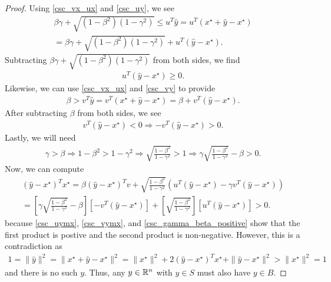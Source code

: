 \begin{proof}
Using \cref{csc_vx_ux} and \cref{csc_uy}, we see
\begin{align*}
\beta\gamma + \sqrt{\left(1 - \beta^2\right)\left(1 - \gamma^2\right)} \le {u}^T\hat y = {u}^T\left(x^{\star} + \hat y - x^{\star}\right) \\
= \beta \gamma + \sqrt{(1 - \beta^2)\left(1 - \gamma^2\right)} + {u}^T\left(\hat y - x^{\star}\right).
\end{align*}
Subtracting $\beta\gamma + \sqrt{\left(1 - \beta^2\right)\left(1 - \gamma^2\right)}$ from both sides, we find
\begin{align}
{u}^T\left(\hat y - x^{\star}\right) \ge 0 \label{csc_uymx}.
\end{align}
Likewise, we can use \cref{csc_vx_ux} and \cref{csc_vy} to provide
\begin{align*}
\beta > {v}^T\hat y = {v}^T\left(x^{\star} + \hat y - x^{\star}\right) = \beta + {v}^T\left(\hat y - x^{\star}\right).
\end{align*}
After subtracting $\beta$ from both sides, we see
\begin{align}
{v}^T\left(\hat y - x^{\star}\right) < 0 \Longrightarrow -{v}^T\left(\hat y - x^{\star}\right) > 0. \label{csc_vymx}
\end{align}
Lastly, we will need
\begin{align}
\gamma > \beta 
\Longrightarrow 1 - \beta^2 > 1 - \gamma^2
\Longrightarrow \sqrt{\frac{1 - \beta^2}{1 - \gamma^2}} > 1
\Longrightarrow \gamma \sqrt{\frac{1 - \beta^2}{1 - \gamma^2}} - \beta > 0. \label{csc_gamma_beta_positive}
\end{align}
Now, we can compute
\begin{align*}
{\left(\hat y - x^{\star}\right)}^Tx^{\star} = 
\beta {\left(\hat y - x^{\star}\right)}^Tv
+ \sqrt{\frac{1 - \beta^2}{1 - \gamma^2}} 
\left(u^T\left(\hat y - x^{\star}\right) - \gamma v^T \left(\hat y - x^{\star}\right) \right)\\ 
= \left[\gamma \sqrt{\frac{1 - \beta^2}{1 - \gamma^2}} - \beta\right] \left[-v^T\left(\hat y - x^{\star}\right)\right]
+ \left[\sqrt{\frac{1 - \beta^2}{1 - \gamma^2}}\right] \left[u^T\left(\hat y - x^{\star}\right) \right] > 0.
\end{align*}
because \cref{csc_uymx}, \cref{csc_vymx}, and \cref{csc_gamma_beta_positive} show that the first product is postive and the second product is non-negative.
However, this is a contradiction as
\begin{align*}
1 = \|\hat y\|^2 = \|x^{\star} + \hat y - x^{\star}\|^2 = \|x^{\star}\|^2 + 2{\left(\hat y - x^{\star}\right)}^Tx^{\star} + \|\hat y - x^{\star}\|^2 > \|x^{\star}\|^2 = 1
\end{align*}
and there is no such $y$.
Thus, any $y \in\mathbb R^n$ with $y \in S$ must also have $y \in B$.
\end{proof}


